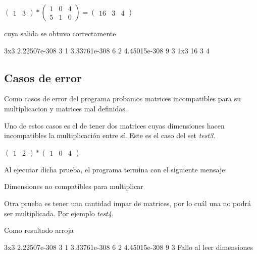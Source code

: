 \documentclass[10pt,a4paper]{article}
\begin{document}
		\begin{center}
		$\begin{pmatrix}
		1 & 3
		\end{pmatrix}
		*
		\begin{pmatrix}
		1 & 0 & 4 \\ 5 & 1 & 0
		\end{pmatrix}
		=
		\begin{pmatrix}
		16 & 3 & 4
		\end{pmatrix}
		$\end{center}
	
		cuya salida se obtuvo correctamente
		
		\begin{bash}
		3x3 2.22507e-308 3 1 3.33761e-308 6 2 4.45015e-308 9 3 
		1x3 16 3 4
		\end{bash}

	\subsection{Casos de error}
		Como casos de error del programa probamos matrices incompatibles para su multiplicacion y matrices mal definidas.

		Uno de estos casos es el de tener dos matrices cuyas dimensiones hacen incompatibles la multiplicación entre sí. Este es el caso del set \textit{test3}.

		
		\begin{center}
		$\begin{pmatrix}
		1 & 2
		\end{pmatrix}
		*
		\begin{pmatrix}
		1 & 0 & 4
		\end{pmatrix}
		$\end{center}

		Al ejecutar dicha prueba, el programa termina con el siguiente mensaje:

		\begin{bash}
		Dimensiones no compatibles para multiplicar
		\end{bash}

		Otra prueba es tener una cantidad impar de matrices, por lo cuál una no podrá ser multiplicada. Por ejemplo \textit{test4}.

		
		
		Como resultado arroja

		\begin{bash}
		3x3 2.22507e-308 3 1 3.33761e-308 6 2 4.45015e-308 9 3
		Fallo al leer dimensiones
		\end{bash}
\end{document}
